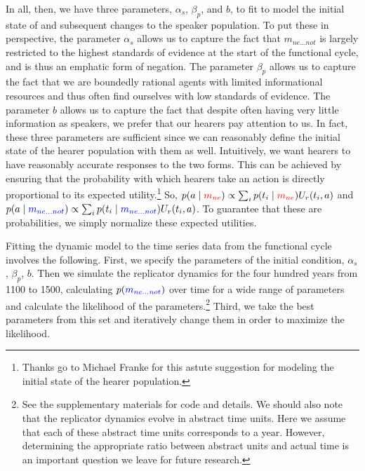 \documentclass[linguex]{sp}
\theoremstyle{definition} \newtheorem{definition}{Definition}
\begin{document}
In all, then, we have three parameters, $\alpha_{s}$, $\beta_p$, and $b$, to fit to model the initial state of and subsequent changes to the speaker population. To put these in perspective, the parameter $\alpha_{s}$ allows us to capture the fact that \textit{\color{blue} $m_{ne...not}$} is largely restricted to the highest standards of evidence at the start of the functional cycle, and is thus an emphatic form of negation. The parameter $\beta_p$ allows us to capture the fact that we are boundedly rational agents with limited informational resources and thus often find ourselves with low standards of evidence. The parameter $b$ allows us to capture the fact that despite often having very little information as speakers, we prefer that our hearers pay attention to us. In fact, these three parameters are sufficient since we can reasonably define the initial state of the hearer population with them as well. Intuitively, we want hearers to have reasonably accurate responses to the two forms. This can be achieved by ensuring that the probability with which hearers take an action is directly proportional to its expected utility.\footnote{Thanks go to Michael Franke for this astute suggestion for modeling the initial state of the hearer population.} So,  $p(a \mid \textit{\color{red} $m_{ne}$}) \propto \sum_i p(t_i \mid \textit{\color{red} $m_{ne}$}) U_r(t_i, a)$ and $p(a \mid \textit{\color{blue} $m_{ne...not}$}) \propto \sum_i p(t_i \mid \textit{\color{blue} $m_{ne...not}$}) U_r(t_i, a)$. To guarantee that these are probabilities, we simply normalize these expected utilities.

Fitting the dynamic model to the time series data from the functional cycle involves the following. First, we  specify the parameters of the initial condition, $\alpha_{s}$, $\beta_p$, $b$. Then we  simulate the replicator dynamics for the four hundred years from 1100 to 1500, calculating $p(\textcolor{blue}{m_{ne...not}})$ over time for a wide range of parameters and calculate the likelihood of the parameters.\footnote{See the supplementary materials for code and details. We should also note that the replicator dynamics evolve in abstract time units. Here we assume that each of these abstract time units corresponds to a year. However, determining the appropriate ratio between abstract units and actual time is an important question we leave for future research.} Third, we take the best parameters from this set and iteratively change them in order to maximize the likelihood.
\end{document}
